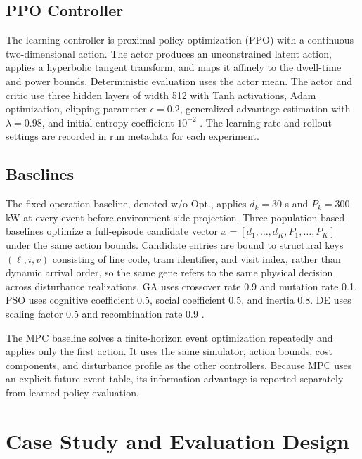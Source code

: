 \documentclass[conference]{IEEEtran}
\begin{document}
\subsection{PPO Controller}
The learning controller is proximal policy optimization (PPO) with a continuous two-dimensional action. The actor produces an unconstrained latent action, applies a hyperbolic tangent transform, and maps it affinely to the dwell-time and power bounds. Deterministic evaluation uses the actor mean. The actor and critic use three hidden layers of width 512 with Tanh activations, Adam optimization, clipping parameter $\epsilon=0.2$, generalized advantage estimation with $\lambda=0.98$, and initial entropy coefficient $10^{-2}$ \cite{schulman2017ppo}. The learning rate and rollout settings are recorded in run metadata for each experiment.

\subsection{Baselines}
The fixed-operation baseline, denoted w/o-Opt., applies $d_k=30$ s and $P_k=300$ kW at every event before environment-side projection. Three population-based baselines optimize a full-episode candidate vector $x=[d_1,\ldots,d_K,P_1,\ldots,P_K]$ under the same action bounds. Candidate entries are bound to structural keys $(\ell,i,v)$ consisting of line code, tram identifier, and visit index, rather than dynamic arrival order, so the same gene refers to the same physical decision across disturbance realizations. GA uses crossover rate 0.9 and mutation rate 0.1. PSO uses cognitive coefficient 0.5, social coefficient 0.5, and inertia 0.8. DE uses scaling factor 0.5 and recombination rate 0.9 \cite{holland1975adaptation,kennedy1995pso,storn1997de}.

The MPC baseline solves a finite-horizon event optimization repeatedly and applies only the first action. It uses the same simulator, action bounds, cost components, and disturbance profile as the other controllers. Because MPC uses an explicit future-event table, its information advantage is reported separately from learned policy evaluation.

\section{Case Study and Evaluation Design}
\end{document}
